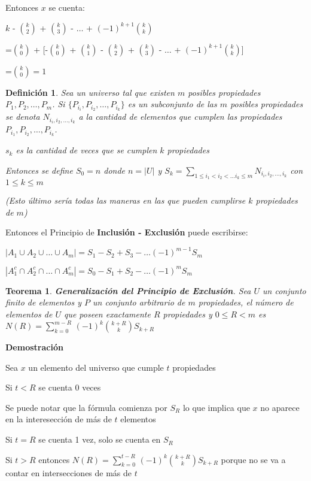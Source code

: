 \documentclass[a4paper,12pt]{report}
\newtheorem*{teo}{Teorema}
\newtheorem*{dfn}{Definición}
\begin{document}
Entonces $x$ se cuenta:

$k$ - $k\choose 2$ + $k\choose 3$ - $\dots$ + $(-1)^{k+1}$$k\choose k$

=$k\choose 0$ + [-$k\choose 0$ + $k\choose 1$ - $k\choose 2$ + $k\choose 3$ - $\dots$ + $(-1)^{k+1}$$k\choose k$]

=$k\choose 0$$=1$




\begin{dfn}
Sea un universo tal que existen $m$ posibles propiedades $P_1,P_2,\dots,P_m$. Si $\{P_{i_i},P_{i_2},\dots,P_{i_k}\}$ es un subconjunto de las $m$ posibles propiedades se denota 
$N_{i_i,i_2,\dots,i_k}$ a la cantidad de elementos que cumplen las propiedades 
$P_{i_1},P_{i_2},\dots,P_{i_k}$. 

$s_k$ es la cantidad de veces que se cumplen $k$ propiedades
 
Entonces se define $S_0=n$ donde $n=|U|$ y 
$S_k=\sum_{1\leq i_1 < i_2 < \dots i_k \leq m} N_{i_i,i_2,\dots,i_k}$ con $1\leq k \leq m$

(Esto último sería todas las maneras en las que pueden cumplirse $k$ propiedades de $m$)
\end{dfn}


Entonces el Principio de \textbf{Inclusión - Exclusión} puede escribirse:

$|A_1\cup A_2\cup \dots \cup A_m| = S_1 - S_2 + S_3 - \dots (-1)^{m-1}S_m$

$|A_1^c\cap A_2^c\cap \dots \cap A_m^c| = S_0 - S_1 + S_2 - \dots (-1)^{m}S_m$

\begin{teo}
 \textbf{Generalización del Principio de Exclusión}. Sea $U$ un conjunto finito de elementos y $P$ un conjunto arbitrario de $m$ propiedades, el número de elementos de $U$ que poseen exactamente $R$ propiedades y $0\leq R < m$ es
 $N(R) = \sum^{m-R}_{k=0}\, (-1)^k$${k+R}\choose{k}$$S_{k+R}$
\end{teo}

\textbf{Demostración}

Sea $x$ un elemento del universo que cumple $t$ propiedades

Si $t<R$ se cuenta 0 veces

Se puede notar que la fórmula comienza por $S_R$ lo que implica que $x$ no aparece en la interesección de más de $t$ elementos

Si $t=R$ se cuenta 1 vez, solo se cuenta en $S_R$

Si $t>R$ entonces $N(R) = \sum^{t-R}_{k=0}\, (-1)^k$${k+R}\choose{k}$$S_{k+R}$ porque no se va a contar en intersecciones de más de $t$
\end{document}
